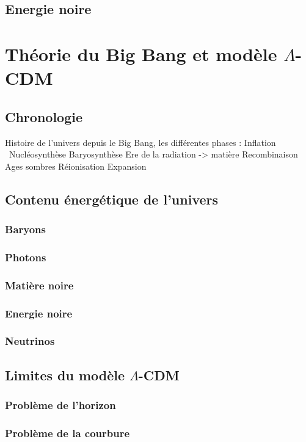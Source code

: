 \subsection{Energie noire}


\section{Théorie du Big Bang et modèle $\Lambda$-CDM}
\subsection{Chronologie}
Histoire de l'univers depuis le Big Bang, les différentes phases :
Inflation \
Nucléosynthèse
Baryosynthèse
Ere de la radiation -> matière
Recombinaison
Ages sombres
Réionisation
Expansion
\subsection{Contenu énergétique de l'univers}
\subsubsection{Baryons}
\subsubsection{Photons}
\subsubsection{Matière noire}
\subsubsection{Energie noire}
\subsubsection{Neutrinos}

\subsection{Limites du modèle $\Lambda$-CDM}
\subsubsection{Problème de l'horizon}
\subsubsection{Problème de la courbure}
